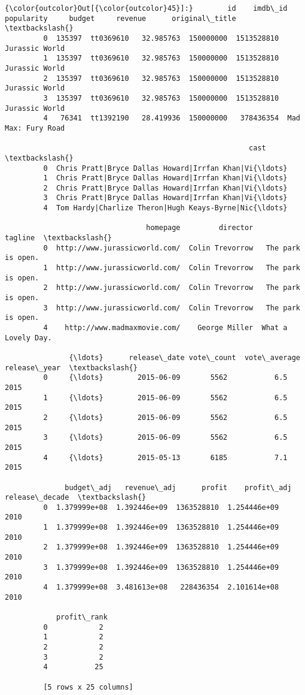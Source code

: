 \documentclass[11pt]{article}
\begin{document}
\begin{Verbatim}[commandchars=\\\{\}]
{\color{outcolor}Out[{\color{outcolor}45}]:}        id    imdb\_id  popularity     budget     revenue      original\_title  \textbackslash{}
         0  135397  tt0369610   32.985763  150000000  1513528810      Jurassic World   
         1  135397  tt0369610   32.985763  150000000  1513528810      Jurassic World   
         2  135397  tt0369610   32.985763  150000000  1513528810      Jurassic World   
         3  135397  tt0369610   32.985763  150000000  1513528810      Jurassic World   
         4   76341  tt1392190   28.419936  150000000   378436354  Mad Max: Fury Road   
         
                                                         cast  \textbackslash{}
         0  Chris Pratt|Bryce Dallas Howard|Irrfan Khan|Vi{\ldots}   
         1  Chris Pratt|Bryce Dallas Howard|Irrfan Khan|Vi{\ldots}   
         2  Chris Pratt|Bryce Dallas Howard|Irrfan Khan|Vi{\ldots}   
         3  Chris Pratt|Bryce Dallas Howard|Irrfan Khan|Vi{\ldots}   
         4  Tom Hardy|Charlize Theron|Hugh Keays-Byrne|Nic{\ldots}   
         
                                 homepage         director             tagline  \textbackslash{}
         0  http://www.jurassicworld.com/  Colin Trevorrow   The park is open.   
         1  http://www.jurassicworld.com/  Colin Trevorrow   The park is open.   
         2  http://www.jurassicworld.com/  Colin Trevorrow   The park is open.   
         3  http://www.jurassicworld.com/  Colin Trevorrow   The park is open.   
         4    http://www.madmaxmovie.com/    George Miller  What a Lovely Day.   
         
               {\ldots}      release\_date vote\_count  vote\_average release\_year  \textbackslash{}
         0     {\ldots}        2015-06-09       5562           6.5         2015   
         1     {\ldots}        2015-06-09       5562           6.5         2015   
         2     {\ldots}        2015-06-09       5562           6.5         2015   
         3     {\ldots}        2015-06-09       5562           6.5         2015   
         4     {\ldots}        2015-05-13       6185           7.1         2015   
         
              budget\_adj   revenue\_adj      profit    profit\_adj  release\_decade  \textbackslash{}
         0  1.379999e+08  1.392446e+09  1363528810  1.254446e+09            2010   
         1  1.379999e+08  1.392446e+09  1363528810  1.254446e+09            2010   
         2  1.379999e+08  1.392446e+09  1363528810  1.254446e+09            2010   
         3  1.379999e+08  1.392446e+09  1363528810  1.254446e+09            2010   
         4  1.379999e+08  3.481613e+08   228436354  2.101614e+08            2010   
         
            profit\_rank  
         0            2  
         1            2  
         2            2  
         3            2  
         4           25  
         
         [5 rows x 25 columns]
\end{Verbatim}
            
\end{document}
